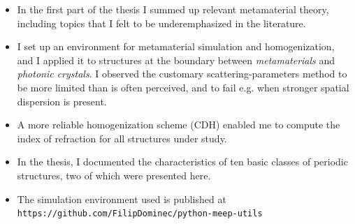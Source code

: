 \documentclass[t]{beamer} \usepackage[english]{babel} \usepackage[utf8]{inputenc} \usetheme{Frankfurt} %
\begin{document}

\begin{frame}[plain]{\tiny{\vspace{-1em}{Conclusions}\vspace{-.5em}}}%
\begin{itemize}
		\vspace{-.3em}
	\item In the first part of the thesis I summed up relevant metamaterial theory, including topics that I felt to be underemphasized in the literature. 


	\item I set up an environment for metamaterial simulation and homogenization, and I applied it to structures at the boundary between \textit{metamaterials} and \textit{photonic crystals}. I observed the customary scattering-parameters method to be more limited than is often perceived, and to fail e.g. when stronger spatial dispersion is present.

	\item A more reliable homogenization scheme (CDH) enabled me to compute the index of refraction for all structures under study.

	\item In the thesis, I documented the characteristics of ten basic classes of periodic structures, two of which were presented here.

	\item The simulation environment used is published at \\
	\texttt{https://github.com/FilipDominec/python-meep-utils} 
	\vfill
\end{itemize}

\end{frame} %
\end{document}

